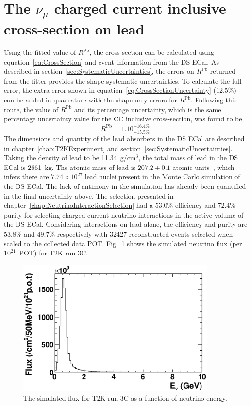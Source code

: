 \section{The $\nu_\mu$ charged current inclusive cross-section on lead}
\label{sec:PbCrossSection}
Using the fitted value of $R^{\textrm{Pb}}$, the cross-section can be calculated using equation~\ref{eq:CrossSection} and event information from the DS ECal.  As described in section~\ref{sec:SystematicUncertainties}, the errors on $R^{\textrm{Pb}}$ returned from the fitter provides the shape systematic uncertainties.  To calculate the full error, the extra error shown in equation~\ref{eq:CrossSectionUncertainty} (12.5$\%)$ can be added in quadrature with the shape-only errors for $R^{\textrm{Pb}}$.  Following this route, the value of $R^{\textrm{Pb}}$ and its percentage uncertainty, which is the same percentage uncertainty value for the CC inclusive cross-section, was found to be
\begin{equation}
R^{\textrm{Pb}} = 1.10^{+16.4\%}_{-15.5\%}.
\label{eq:RPbWithFullPercentageError}
\end{equation}
The dimensions and quantity of the lead absorbers in the DS ECal are described in chapter~\ref{chap:T2KExperiment} and section~\ref{sec:SystematicUncertainties}.  Taking the density of lead to be 11.34~g/cm$^{3}$, the total mass of lead in the DS ECal is 2661~kg.  The atomic mass of lead is $207.2\pm0.1$ atomic units~\cite{LeadAtomicUnits}, which infers there are $7.74\times10^{27}$ lead nuclei present in the Monte Carlo simulation of the DS ECal.  The lack of antimony in the simulation has already been quantified in the final uncertainty above.
\newline
\newline
The selection presented in chapter~\ref{chap:NeutrinoInteractionSelection} had a $53.0\%$ efficiency and $72.4\%$ purity for selecting charged-current neutrino interactions in the active volume of the DS ECal.  Considering interactions on lead alone, the efficiency and purity are $53.8\%$ and $49.7\%$ respectively with 32427 reconstructed events selected when scaled to the collected data POT.
\newline
\newline
Fig.~\ref{fig:Run3CFlux} shows the simulated neutrino flux (per $10^{21}$~POT) for T2K run 3C.  
\begin{figure}
  \centering
  \includegraphics[width=10cm]{images/measurement/xsec/run3c_flux.eps}
  \caption{The simulated flux for T2K run 3C as a function of neutrino energy.}
  \label{fig:Run3CFlux}
\end{figure}
